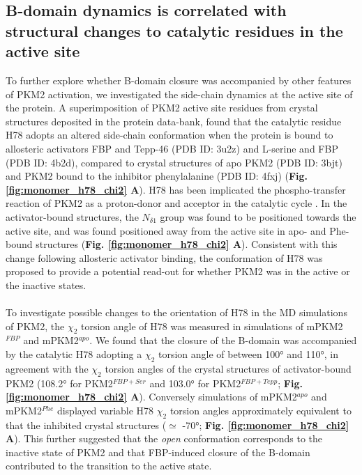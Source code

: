 \clearpage


\subsection{B-domain dynamics is correlated with structural changes to catalytic residues in the active site}
%
%
To further explore whether B-domain closure was accompanied by other features of PKM2 activation, we investigated the side-chain dynamics at the active site of the protein. A superimposition of PKM2 active site residues from crystal structures deposited in the protein data-bank, found that the catalytic residue H78 adopts an altered side-chain conformation when the protein is bound to allosteric activators FBP and Tepp-46 (PDB ID: 3u2z) and L-serine and FBP (PDB ID: 4b2d), compared to crystal structures of apo PKM2 (PDB ID: 3bjt) and PKM2 bound to the inhibitor phenylalanine (PDB ID: 4fxj) (\textbf{Fig. \ref{fig:monomer_h78_chi2} A}). H78 has been implicated the phospho-transfer reaction of PKM2 as a proton-donor and acceptor in the catalytic cycle \cite{Hollenberg:1971aa}.  In the activator-bound structures, the $N_{\delta 1}$ group was found to be positioned towards the active site, and was found positioned away from the active site in apo- and Phe-bound structures (\textbf{Fig. \ref{fig:monomer_h78_chi2} A}). Consistent with this change following allosteric activator binding, the conformation of H78 was proposed to provide a potential read-out for whether PKM2 was in the active or the inactive states. 
%
%
\\\\
%
%
To investigate possible changes to the orientation of H78 in the MD simulations of PKM2, the $\chi_{2}$ torsion angle of H78 was measured in simulations of mPKM2$^{FBP}$ and mPKM2$^{apo}$. We found that the closure of the B-domain was accompanied by the catalytic H78 adopting a $\chi_{2}$ torsion angle of between \ang{100} and \ang{110}, in agreement with the $\chi_{2}$ torsion angles of the crystal structures of activator-bound PKM2 (\ang{108.2} for PKM2$^{FBP + Ser}$ and \ang{103.0} for PKM2$^{FBP + Tepp}$; \textbf{Fig. \ref{fig:monomer_h78_chi2} A}). Conversely simulations of mPKM2$^{apo}$ and mPKM2$^{Phe}$ displayed variable H78 $\chi_{2}$ torsion angles approximately equivalent to that the inhibited crystal structures ($\simeq$ \ang{-70}; \textbf{Fig. \ref{fig:monomer_h78_chi2} A}). This further suggested that the \textit{open} conformation corresponds to the inactive state of PKM2 and that FBP-induced closure of the B-domain contributed to the transition to the active state.

